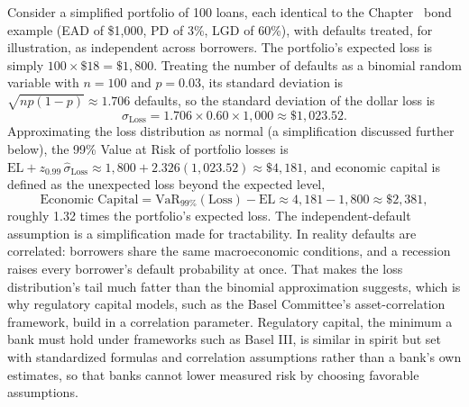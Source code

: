 \documentclass[../ai_in_finance]{subfiles}
\begin{document}
Consider a simplified portfolio of 100 loans, each identical to the Chapter~ bond example (EAD of \$1,000, PD of 3\%, LGD of 60\%), with defaults treated, for illustration, as independent across borrowers. The portfolio's expected loss is simply $100 \times \$18 = \$1{,}800$. Treating the number of defaults as a binomial random variable with $n=100$ and $p=0.03$, its standard deviation is $\sqrt{np(1-p)} \approx 1.706$ defaults, so the standard deviation of the dollar loss is
\begin{equation*}
\hat\sigma_{\text{Loss}} = 1.706 \times 0.60 \times 1{,}000 \approx \$1{,}023.52.
\end{equation*}
Approximating the loss distribution as normal (a simplification discussed further below), the 99\% Value at Risk of portfolio losses is $\text{EL} + z_{0.99}\,\hat\sigma_{\text{Loss}} \approx 1{,}800 + 2.326(1{,}023.52) \approx \$4{,}181$, and economic capital is defined as the unexpected loss beyond the expected level,
\begin{equation*}
\text{Economic Capital} = \text{VaR}_{99\%}(\text{Loss}) - \text{EL} \approx 4{,}181 - 1{,}800 \approx \$2{,}381,
\end{equation*}
roughly 1.32 times the portfolio's expected loss. The independent-default assumption is a simplification made for tractability. In reality defaults are correlated: borrowers share the same macroeconomic conditions, and a recession raises every borrower's default probability at once. That makes the loss distribution's tail much fatter than the binomial approximation suggests, which is why regulatory capital models, such as the Basel Committee's asset-correlation framework, build in a correlation parameter.
Regulatory capital, the minimum a bank must hold under frameworks such as Basel III, is similar in spirit but set with standardized formulas and correlation assumptions rather than a bank's own estimates, so that banks cannot lower measured risk by choosing favorable assumptions.
\end{document}
